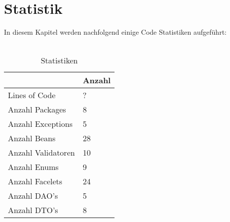 \chapter{Statistik}

In diesem Kapitel werden nachfolgend einige Code Statistiken aufgeführt:\ \\
\ \\
\begin{table}[h]
	\begin{center}
		\begin{tabular}{|p{6cm}|p{6cm}|}
			\hline \textbf{} & \textbf{Anzahl}  \\ 
			\hline Lines of Code &  ? \\ 
			\hline Anzahl Packages & 8  \\ 
			\hline Anzahl Exceptions & 5 \\ 
			\hline Anzahl Beans &  28 \\ 
			\hline Anzahl Validatoren & 10\\ 
			\hline Anzahl Enums & 9\\
			\hline Anzahl Facelets & 24\\
			\hline Anzahl DAO's & 5\\
			\hline Anzahl DTO's & 8\\
			\hline 
		\end{tabular} 
		\caption{Statistiken}
		\label{fig:Statistiken}
	\end{center}
\end{table}